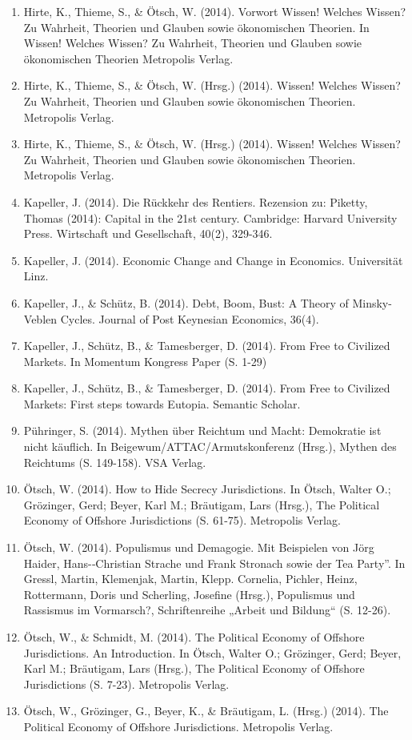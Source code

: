 \begin{enumerate}
	 \item Hirte, K., Thieme, S., \& Ötsch, W. (2014). Vorwort Wissen! Welches Wissen? Zu Wahrheit, Theorien und Glauben sowie ökonomischen Theorien. In Wissen! Welches Wissen? Zu Wahrheit, Theorien und Glauben sowie ökonomischen Theorien Metropolis Verlag.
	 \item Hirte, K., Thieme, S., \& Ötsch, W. (Hrsg.) (2014). Wissen! Welches Wissen? Zu Wahrheit, Theorien und Glauben sowie ökonomischen Theorien. Metropolis Verlag.
	 \item Hirte, K., Thieme, S., \& Ötsch, W. (Hrsg.) (2014). Wissen! Welches Wissen? Zu Wahrheit, Theorien und Glauben sowie ökonomischen Theorien. Metropolis Verlag.
	 \item Kapeller, J. (2014). Die Rückkehr des Rentiers. Rezension zu: Piketty, Thomas (2014): Capital in the 21st century. Cambridge: Harvard University Press. Wirtschaft und Gesellschaft, 40(2), 329-346.
	 \item Kapeller, J. (2014). Economic Change and Change in Economics. Universität Linz.
	 \item Kapeller, J., \& Schütz, B. (2014). Debt, Boom, Bust: A Theory of Minsky-Veblen Cycles. Journal of Post Keynesian Economics, 36(4).
	 \item Kapeller, J., Schütz, B., \& Tamesberger, D. (2014). From Free to Civilized Markets. In Momentum Kongress Paper (S. 1-29)
	 \item Kapeller, J., Schütz, B., \& Tamesberger, D. (2014). From Free to Civilized Markets: First steps towards Eutopia. Semantic Scholar.
	 \item Pühringer, S. (2014). Mythen über Reichtum und Macht: Demokratie ist nicht käuflich. In Beigewum/ATTAC/Armutskonferenz (Hrsg.), Mythen des Reichtums (S. 149-158). VSA Verlag.
	 \item Ötsch, W. (2014). How to Hide Secrecy Jurisdictions. In Ötsch, Walter O.; Grözinger, Gerd; Beyer, Karl M.; Bräutigam, Lars (Hrsg.), The Political Economy of Offshore Jurisdictions (S. 61-75). Metropolis Verlag.
	 \item Ötsch, W. (2014). Populismus und Demagogie. Mit Beispielen von Jörg Haider, Hans-­‐Christian Strache und Frank Stronach sowie der Tea Party”. In Gressl, Martin, Klemenjak, Martin, Klepp. Cornelia, Pichler, Heinz, Rottermann, Doris und Scherling, Josefine (Hrsg.), Populismus und Rassismus im Vormarsch?, Schriftenreihe „Arbeit und Bildung“ (S. 12-26).
	 \item Ötsch, W., \& Schmidt, M. (2014). The Political Economy of Offshore Jurisdictions. An Introduction. In Ötsch, Walter O.; Grözinger, Gerd; Beyer, Karl M.; Bräutigam, Lars (Hrsg.), The Political Economy of Offshore Jurisdictions (S. 7-23). Metropolis Verlag.
	 \item Ötsch, W., Grözinger, G., Beyer, K., \& Bräutigam, L. (Hrsg.) (2014). The Political Economy of Offshore Jurisdictions. Metropolis Verlag.
\end{enumerate}
